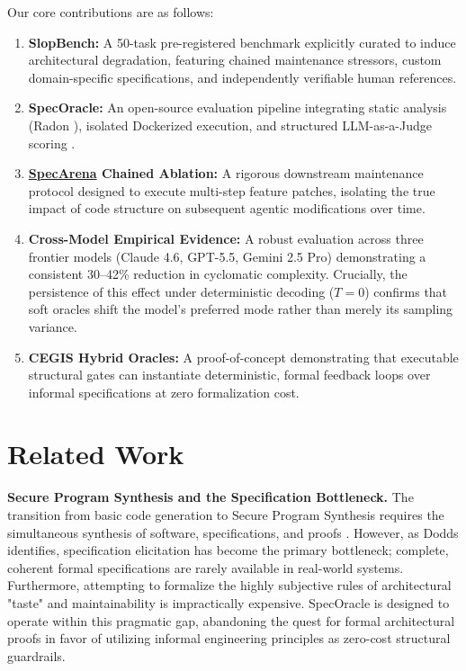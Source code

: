 \documentclass[11pt]{article}
\begin{document}
Our core contributions are as follows:
\begin{enumerate}[label=\arabic*.]
    \item \textbf{SlopBench:} A 50-task pre-registered benchmark explicitly curated to induce architectural degradation, featuring chained maintenance stressors, custom domain-specific specifications, and independently verifiable human references.
    \item \textbf{SpecOracle:} An open-source evaluation pipeline integrating static analysis (Radon \cite{Radon}), isolated Dockerized execution, and structured LLM-as-a-Judge scoring \cite{Zheng2023Judge}.
    \item \textbf{\href{https://github.com/davidkimai/specoracle/blob/main/src/specoracle/stress.py}{SpecArena} Chained Ablation:} A rigorous downstream maintenance protocol designed to execute multi-step feature patches, isolating the true impact of code structure on subsequent agentic modifications over time.
    \item \textbf{Cross-Model Empirical Evidence:} A robust evaluation across three frontier models (Claude 4.6, GPT-5.5, Gemini 2.5 Pro) demonstrating a consistent 30--42\% reduction in cyclomatic complexity. Crucially, the persistence of this effect under deterministic decoding ($T=0$) confirms that soft oracles shift the model's preferred mode rather than merely its sampling variance.
    \item \textbf{CEGIS Hybrid Oracles:} A proof-of-concept demonstrating that executable structural gates can instantiate deterministic, formal feedback loops over informal specifications at zero formalization cost.
\end{enumerate}

\section{Related Work}

\textbf{Secure Program Synthesis and the Specification Bottleneck.} 
The transition from basic code generation to Secure Program Synthesis requires the simultaneous synthesis of software, specifications, and proofs \cite{VonHippel2026SPS}. However, as Dodds \cite{Dodds2025Specs} identifies, specification elicitation has become the primary bottleneck; complete, coherent formal specifications are rarely available in real-world systems. Furthermore, attempting to formalize the highly subjective rules of architectural "taste" and maintainability is impractically expensive. SpecOracle is designed to operate within this pragmatic gap, abandoning the quest for formal architectural proofs in favor of utilizing informal engineering principles as zero-cost structural guardrails.
\end{document}
